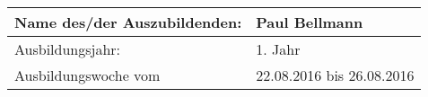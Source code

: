 
	\begin{center}
		\begin{tabular}{ | m{15em} | m{21em} | }
		\hline
		Name des/der Auszubildenden: & Paul Bellmann \\ \hline
		Ausbildungsjahr: & 1. Jahr \\ \hline
		Ausbildungswoche vom & 22.08.2016 bis 26.08.2016 \\ \hline
		\end{tabular}
	\end{center}
